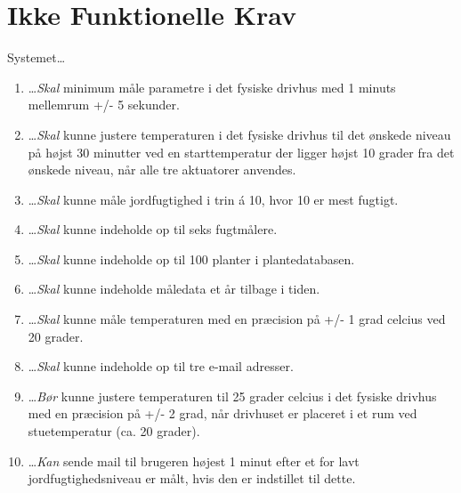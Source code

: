 \clearpage


\section{Ikke Funktionelle Krav}
Systemet\ldots
\begin{enumerate}\itemsep1pt \parskip0pt 
	\item \ldots \emph{Skal} minimum måle parametre i det fysiske drivhus med 1 minuts mellemrum +/- 5 sekunder.
	\item \ldots \emph{Skal} kunne justere temperaturen i det fysiske drivhus til det ønskede niveau på højst 30 minutter ved en starttemperatur der ligger højst 10 grader fra det ønskede niveau, når alle tre aktuatorer anvendes.
	\item \ldots \emph{Skal} kunne måle jordfugtighed i trin á 10, hvor 10 er mest fugtigt. 
	\item \ldots \emph{Skal} kunne indeholde op til seks fugtmålere.
	\item \ldots \emph{Skal} kunne indeholde op til 100 planter i plantedatabasen.
	\item \ldots \emph{Skal} kunne indeholde måledata et år tilbage i tiden.
	\item \ldots \emph{Skal} kunne måle temperaturen med en præcision på +/- 1 grad celcius ved 20 grader.
	\item \ldots \emph{Skal} kunne indeholde op til tre e-mail adresser.
	\item \ldots \emph{Bør} kunne justere temperaturen til 25 grader celcius i det fysiske drivhus med en præcision på +/- 2 grad, når drivhuset er placeret i et rum ved stuetemperatur (ca. 20 grader).
	\item \ldots \emph{Kan} sende mail til brugeren højest 1 minut efter et for lavt jordfugtighedsniveau er målt, hvis den er indstillet til dette.
\end{enumerate}

\clearpage


